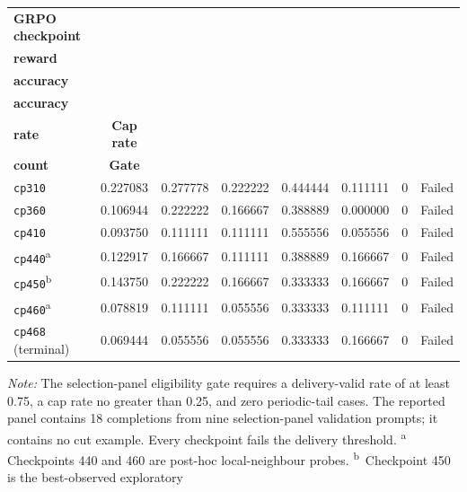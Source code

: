 \begin{table}[htbp]
    \centering
    \scriptsize
    \setlength{\tabcolsep}{3.5pt}
    \renewcommand{\arraystretch}{1.15}
    \begin{tabular}{@{}lccccccc@{}}
        \toprule
        \textbf{GRPO checkpoint} &
        \makecell{\textbf{Mean}\\\textbf{reward}} &
        \makecell{\textbf{Direction}\\\textbf{accuracy}} &
        \makecell{\textbf{Exact-action}\\\textbf{accuracy}} &
        \makecell{\textbf{Delivery-valid}\\\textbf{rate}} &
        \textbf{Cap rate} &
        \makecell{\textbf{Periodic-tail}\\\textbf{count}} &
        \textbf{Gate} \\
        \midrule
        \texttt{cp310} & 0.227083 & 0.277778 & 0.222222 & 0.444444 & 0.111111 & 0 & Failed \\
        \texttt{cp360} & 0.106944 & 0.222222 & 0.166667 & 0.388889 & 0.000000 & 0 & Failed \\
        \texttt{cp410} & 0.093750 & 0.111111 & 0.111111 & 0.555556 & 0.055556 & 0 & Failed \\
        \texttt{cp440}\textsuperscript{a} & 0.122917 & 0.166667 & 0.111111 & 0.388889 & 0.166667 & 0 & Failed \\
        \texttt{cp450}\textsuperscript{b} & 0.143750 & 0.222222 & 0.166667 & 0.333333 & 0.166667 & 0 & Failed \\
        \texttt{cp460}\textsuperscript{a} & 0.078819 & 0.111111 & 0.055556 & 0.333333 & 0.111111 & 0 & Failed \\
        \texttt{cp468} (terminal) & 0.069444 & 0.055556 & 0.055556 & 0.333333 & 0.166667 & 0 & Failed \\
        \bottomrule
    \end{tabular}
    \begin{minipage}{0.97\textwidth}
        \vspace{2pt}
        \footnotesize
        \textit{Note:} The selection-panel eligibility gate requires a
        delivery-valid rate of at least 0.75, a cap rate no greater than 0.25,
        and zero periodic-tail cases. The reported panel contains 18 completions
        from nine selection-panel validation prompts; it contains no cut example.
        Every checkpoint fails the delivery threshold. \textsuperscript{a}
        Checkpoints 440 and 460 are post-hoc local-neighbour probes.
        \textsuperscript{b}\ Checkpoint 450 is the best-observed exploratory

\end{minipage}
\end{table}
